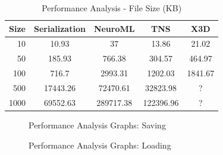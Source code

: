\documentclass{acm_proc_article-sp}
\begin{document}
{\begin{table}[t]
\centering
\begin{tabular}{|r || c | c | c | c |}
\hline
Size & Serialization & NeuroML & TNS & X3D \\
\hline
10 & 10.93 & 37 & 13.86 & 21.02 \\
50 & 185.93 & 766.38 & 304.57 & 464.97 \\
100 & 716.7 & 2993.31 & 1202.03 & 1841.67 \\
500 & 17443.26 & 72470.61 & 32823.98 & ? \\
1000 & 69552.63 & 289717.38 & 122396.96 & ? \\
\hline
\end{tabular}
\caption{Performance Analysis - File Size (KB)}
\label{persistence:size}
\end{table}

\begin{figure}[t]
\centering
{}
\caption{Performance Analysis Graphs: Saving}
\label{fig:persistence:perf:save}
\end{figure}

\begin{figure}[t]
\centering
{}
\caption{Performance Analysis Graphs: Loading}
\label{appendix:persistence:perf:load}
\end{figure}

}
\end{document}
